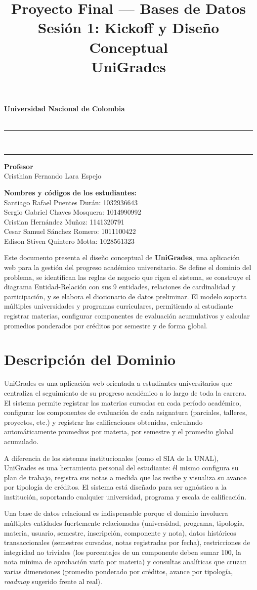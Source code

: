 \documentclass[12pt, letterpaper, twoside]{article}
\title{\textbf{Proyecto Final --- Bases de Datos\\[0.3em]
Sesión 1: Kickoff y Diseño Conceptual\\[0.3em]
\guillemotleft UniGrades\guillemotright}}
\affiliation{Sede Bogotá}
\renewenvironment{abstract}{%
  \small\begin{center}%
  {\bfseries\abstractname\vspace{-.5em}}%
  \end{center}%
  \quotation}{%
  \endquotation}
\renewcommand{\maketitle}{%
\begin{titlepage}
  \centering
  \vspace*{1.5cm}
  {\large\bfseries\color{azulUNAL}
    Universidad Nacional de Colombia\\[0.3em]
    \normalsize\color{black}\theaffiliation\\[0.1em]
    \thedepartment\par}
  \vspace{1cm}
  \rule{\linewidth}{1.5pt}\\[0.4em]
  {\LARGE\bfseries\thetitle\par}
  \rule{\linewidth}{1.5pt}
  \vspace{1cm}

  {\normalsize\textbf{Profesor}\\[0.2em]
  Cristhian Fernando Lara Espejo\par}

  \vspace{1.2cm}

  {\normalsize\textbf{Nombres y códigos de los estudiantes:}\\[0.4em]
  Santiago Rafael Puentes Durán: 1032936643\\[0.2em]
  Sergio Gabriel Chaves Mosquera: 1014990992\\[0.2em]
  Cristian Hernández Muñoz: 1141320791\\[0.2em]
  Cesar Samuel Sánchez Romero: 1011100422\\[0.2em]
  Edison Stiven Quintero Motta: 1028561323\par}

  \vfill
  {\small\color{gray}\thetheyear}
\end{titlepage}
}
\begin{document}
\maketitle
\thispagestyle{firstpage}
\newpage

\begin{abstract}
\noindent
Este documento presenta el diseño conceptual de \textbf{UniGrades}, una aplicación
web para la gestión del progreso académico universitario. Se define el dominio del
problema, se identifican las reglas de negocio que rigen el sistema, se construye
el diagrama Entidad-Relación con sus 9 entidades, relaciones de cardinalidad y
participación, y se elabora el diccionario de datos preliminar. El modelo soporta
múltiples universidades y programas curriculares, permitiendo al estudiante registrar
materias, configurar componentes de evaluación acumulativos y calcular promedios
ponderados por créditos por semestre y de forma global.
\end{abstract}

\vspace{1.5cm}
\tableofcontents
\newpage

\section{Descripción del Dominio}
\label{sec:dominio}

UniGrades es una aplicación web orientada a estudiantes universitarios que centraliza
el seguimiento de su progreso académico a lo largo de toda la carrera. El sistema
permite registrar las materias cursadas en cada período académico, configurar los
componentes de evaluación de cada asignatura (parciales, talleres, proyectos, etc.)
y registrar las calificaciones obtenidas, calculando automáticamente promedios por
materia, por semestre y el promedio global acumulado.

A diferencia de los sistemas institucionales (como el SIA de la UNAL), UniGrades
es una herramienta personal del estudiante: él mismo configura su plan de trabajo,
registra sus notas a medida que las recibe y visualiza su avance por tipología de
créditos. El sistema está diseñado para ser agnóstico a la institución, soportando
cualquier universidad, programa y escala de calificación.

Una base de datos relacional es indispensable porque el dominio involucra múltiples
entidades fuertemente relacionadas (universidad, programa, tipología, materia,
usuario, semestre, inscripción, componente y nota), datos históricos transaccionales
(semestres cursados, notas registradas por fecha), restricciones de integridad no
triviales (los porcentajes de un componente deben sumar 100, la nota mínima de
aprobación varía por materia) y consultas analíticas que cruzan varias dimensiones
(promedio ponderado por créditos, avance por tipología, \textit{roadmap} sugerido
frente al real).
\end{document}
